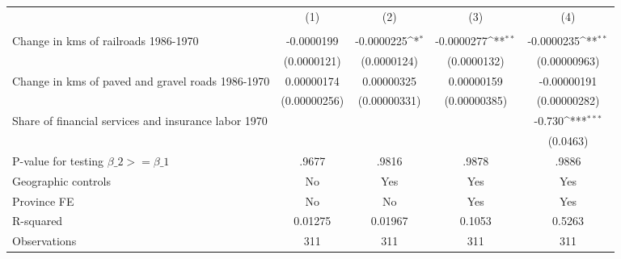{
\def\sym#1{\ifmmode^{#1}\else\(^{#1}\)\fi}
\begin{tabular}{l*{4}{c}}
\hline\hline
                &\multicolumn{1}{c}{(1)}&\multicolumn{1}{c}{(2)}&\multicolumn{1}{c}{(3)}&\multicolumn{1}{c}{(4)}\\
                &\multicolumn{1}{c}{}&\multicolumn{1}{c}{}&\multicolumn{1}{c}{}&\multicolumn{1}{c}{}\\
\hline
Change in kms of railroads 1986-1970&-0.0000199         &-0.0000225\sym{*}  &-0.0000277\sym{**} &-0.0000235\sym{**} \\
                &(0.0000121)         &(0.0000124)         &(0.0000132)         &(0.00000963)         \\
[1em]
Change in kms of paved and gravel roads 1986-1970&0.00000174         &0.00000325         &0.00000159         &-0.00000191         \\
                &(0.00000256)         &(0.00000331)         &(0.00000385)         &(0.00000282)         \\
[1em]
Share of financial services and insurance labor 1970&                  &                  &                  &   -0.730\sym{***}\\
                &                  &                  &                  & (0.0463)         \\
\hline
P-value for testing $\beta\_{2} >= \beta\_{1}$&    .9677         &    .9816         &    .9878         &    .9886         \\
Geographic controls&       No         &      Yes         &      Yes         &      Yes         \\
Province FE     &       No         &       No         &      Yes         &      Yes         \\
R-squared       &  0.01275         &  0.01967         &   0.1053         &   0.5263         \\
Observations    &      311         &      311         &      311         &      311         \\
\hline\hline
\end{tabular}
}
